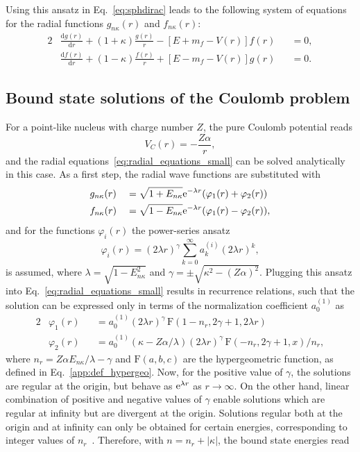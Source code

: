 Using this ansatz in Eq.~\eqref{eq:sphdirac} leads to the following system of equations for the radial functions $g_{n\kappa}(r)$ and $f_{n\kappa}(r)$:
\begin{alignat}{2}
& \frac{\mathrm{d}g(r)}{\mathrm{d}r}+(1+\kappa)\frac{g(r)}{r}
-\left[ E+m_f-V(r) \right] f(r) &&= 0,\\[7.5pt]
&\frac{\mathrm{d}f(r)}{\mathrm{d}r}+(1-\kappa)\frac{f(r)}{r}
+\left[ E-m_f-V(r) \right] g(r) &&= 0.
\label{eq:radial_equations_small}
\end{alignat}

\subsection{Bound state solutions of the Coulomb problem}
For a point-like nucleus with charge number $Z$, the pure Coulomb potential reads
\begin{equation}
\label{eq:pureCoulomb}
V_C(r)=-\frac{Z\alpha}{r},
\end{equation}
and the radial equations~\eqref{eq:radial_equations_small} can be solved analytically in this case. As a first step, the radial wave functions are substituted with
\begin{alignat}{2}
&g_{n\kappa}(r)&&= \sqrt{1+E_{n\kappa}}\text{e}^{-\lambda r}(\varphi_1(r)+\varphi_2(r)) \\
&f_{n\kappa}(r)&&=\sqrt{1-E_{n\kappa}}\text{e}^{-\lambda r}(\varphi_1(r)-\varphi_2(r)),
\end{alignat}
and for the functions $\varphi_i(r)$ the power-series ansatz
\begin{equation}
\varphi_i(r)=(2\lambda r)^\gamma \sum_{k=0}^\infty a^{(i)}_k (2\lambda r)^k,
\end{equation}
is assumed, where $\lambda = \sqrt{1-E^2_{n\kappa}}$ and $\gamma=\pm \sqrt{\kappa^2 - (Z\alpha)^2}$. Plugging this ansatz into Eq.~\eqref{eq:radial_equations_small} results in recurrence relations, such that the solution can be expressed only in terms of the normalization coefficient $a^{(1)}_0$ as
\begin{alignat}{2}
& \varphi_1(r)&&=a^{(1)}_0 (2\lambda r)^\gamma\, \text{F}(1-n_r,2\gamma+1,2\lambda r)\\
& \varphi_2(r) &&= a^{(1)}_0 (\kappa -Z\alpha / \lambda) (2\lambda r)^\gamma\, \text{F}(-n_r,2\gamma+1,x) /n_r,
\end{alignat}
where $n_r=Z\alpha E_{n\kappa}/\lambda - \gamma$ and $\text{F}(a,b,c)$ are the hypergeometric function, as defined in Eq.~\eqref{app:def_hypergeo}. Now, for the positive value of $\gamma$, the solutions are regular at the origin, but behave as $\text{e}^{\lambda r}$ as $r\rightarrow \infty$. On the other hand, linear combination of positive and negative values of $\gamma$ enable solutions which are regular at infinity but are divergent at the origin. Solutions regular both at the origin and at infinity can only be obtained for certain energies, corresponding to integer values of $n_r$~\cite{rose1961}. Therefore, with $n=n_r+|\kappa|$, the bound state energies read
